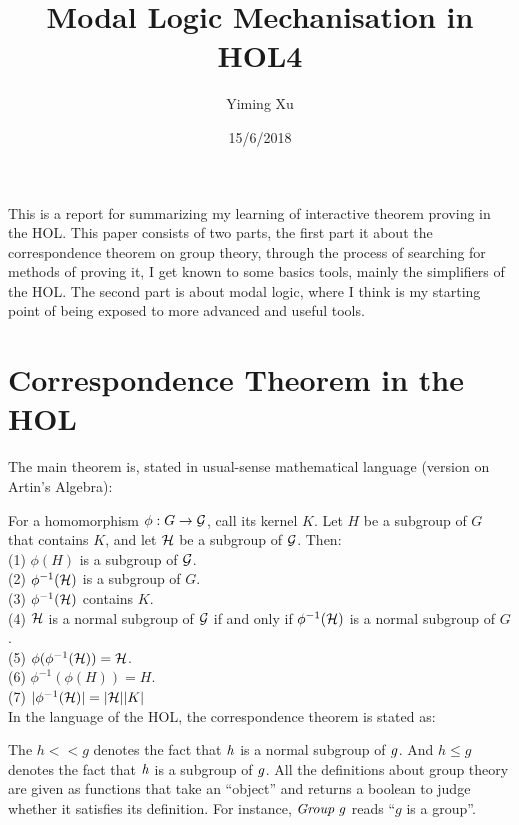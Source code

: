 \documentclass{report}
\title{Modal Logic Mechanisation in HOL4}
\author{Yiming Xu}
\date{15/6/2018}
\renewcommand{\HOLinline}[1]{\ensuremath{#1}}
\begin{document}
\maketitle

This is a report for summarizing my learning of interactive theorem proving in the HOL. This paper consists of two parts, the first part it about the correspondence theorem on group theory, through the process of searching for methods of proving it, I get known to some basics tools, mainly the simplifiers of the HOL. The second part is about modal logic, where I think is my starting point of being exposed to more advanced and useful tools.

\section{Correspondence Theorem in the HOL}

The main theorem is, stated in usual-sense mathematical language (version on Artin's Algebra):

For a homomorphism $\phi: G \to {\cal G}$, call its kernel $K$. Let $H$ be a subgroup of $G$ that contains $K$, and let ${\cal H}$ be a subgroup of ${\cal G}$.
Then: \\
(1) $\phi (H)$ is a subgroup of ${\cal G}$. \\
(2) $\phi^{-1}({\cal H})$ is a subgroup of $G$. \\
(3) $\phi^{-1}({\cal H})$ contains $K$. \\
(4) ${\cal H}$ is a normal subgroup of ${\cal G}$ if and only if $\phi^{-1}({\cal H})$ is a normal subgroup of $G$. \\
(5) $\phi (\phi^{-1}({\cal H})) = {\cal H}$. \\
(6) $\phi^{-1}(\phi (H)) = H$. \\
(7) $|\phi^{-1}({\cal H})| = |{\cal H}| |K|$ \\

In the language of the HOL, the correspondence theorem is stated as:


The $h < < g$ denotes the fact that \HOLinline{\HOLFreeVar{h}} is a normal subgroup of \HOLinline{\HOLFreeVar{g}}. And $h \le g$ denotes the fact that \HOLinline{\HOLFreeVar{h}} is a subgroup of \HOLinline{\HOLFreeVar{g}}. All the definitions about group theory are given as functions that take an ``object'' and returns a boolean to judge whether it satisfies its definition. For instance, \HOLinline{\HOLFreeVar{Group}\;\HOLFreeVar{g}} reads ``$g$ is a group''.
\end{document}
